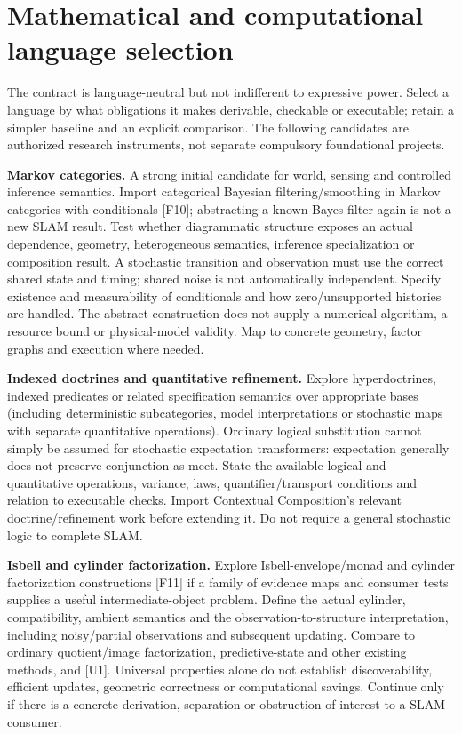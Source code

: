 \documentclass[11pt,letterpaper]{article}
\begin{document}
\section{Mathematical and computational language selection}
The contract is language-neutral but not indifferent to expressive power. Select a language by what obligations it makes derivable, checkable or executable; retain a simpler baseline and an explicit comparison. The following candidates are authorized research instruments, not separate compulsory foundational projects.

\textbf{Markov categories.} A strong initial candidate for world, sensing and controlled inference semantics. Import categorical Bayesian filtering/smoothing in Markov categories with conditionals [F10]; abstracting a known Bayes filter again is not a new SLAM result. Test whether diagrammatic structure exposes an actual dependence, geometry, heterogeneous semantics, inference specialization or composition result. A stochastic transition and observation must use the correct shared state and timing; shared noise is not automatically independent. Specify existence and measurability of conditionals and how zero/unsupported histories are handled. The abstract construction does not supply a numerical algorithm, a resource bound or physical-model validity. Map to concrete geometry, factor graphs and execution where needed.

\textbf{Indexed doctrines and quantitative refinement.} Explore hyperdoctrines, indexed predicates or related specification semantics over appropriate bases (including deterministic subcategories, model interpretations or stochastic maps with separate quantitative operations). Ordinary logical substitution cannot simply be assumed for stochastic expectation transformers: expectation generally does not preserve conjunction as meet. State the available logical and quantitative operations, variance, laws, quantifier/transport conditions and relation to executable checks. Import Contextual Composition's relevant doctrine/refinement work before extending it. Do not require a general stochastic logic to complete SLAM.

\textbf{Isbell and cylinder factorization.} Explore Isbell-envelope/monad and cylinder factorization constructions [F11] if a family of evidence maps and consumer tests supplies a useful intermediate-object problem. Define the actual cylinder, compatibility, ambient semantics and the observation-to-structure interpretation, including noisy/partial observations and subsequent updating. Compare to ordinary quotient/image factorization, predictive-state and other existing methods, and [U1]. Universal properties alone do not establish discoverability, efficient updates, geometric correctness or computational savings. Continue only if there is a concrete derivation, separation or obstruction of interest to a SLAM consumer.
\end{document}
